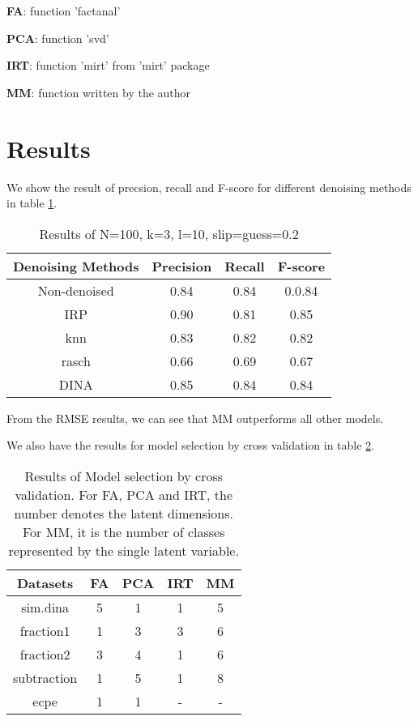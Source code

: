 \documentclass[11pt]{article}
\begin{document}
\textbf{FA}: function 'factanal'
  
\textbf{PCA}: function 'svd' 

\textbf{IRT}: function 'mirt' from 'mirt' package  

\textbf{MM}: function written by the author

\section{Results}
We show the result of precsion, recall and F-score for different denoising methods in table \ref{tab:results}.
\begin{table}[!h]
\begin{center}
\begin{tabular}{|c|c|c|c|}
\hline
Denoising Methods & Precision & Recall & F-score\\
\hline
Non-denoised & 0.84 & 0.84 & 0.0.84  \\
\hline
IRP & 0.90 & 0.81 & 0.85 \\
\hline
knn & 0.83 & 0.82 & 0.82 \\
\hline
rasch & 0.66 & 0.69 & 0.67 \\
\hline
DINA & 0.85 & 0.84 & 0.84 \\
\hline
\end{tabular}
\end{center}
\caption{Results of N=100, k=3, l=10, slip=guess=0.2}\label{tab:results}
\end{table}

From the RMSE results, we can see that MM outperforms all other models.

We also have the results for model selection by cross validation in table \ref{tab:Model}.
\begin{table}[!h]
\begin{center}
\begin{tabular}{|c|c|c|c|c|}
\hline
Datasets & FA & PCA & IRT & MM\\
\hline
sim.dina & 5 & 1 & 1 & 5 \\
\hline
fraction1 & 1 & 3 & 3 & 6 \\
\hline
fraction2 & 3 & 4 & 1 & 6 \\
\hline
subtraction & 1 & 5 & 1 & 8 \\
\hline
ecpe & 1 & 1 & - & - \\
\hline
\end{tabular}
\end{center}
\caption{Results of Model selection by cross validation. For FA, PCA and IRT, the number denotes the latent dimensions. For MM, it is the number of classes represented by the single latent variable.}\label{tab:Model}
\end{table}
\end{document}
